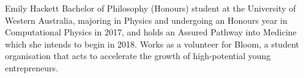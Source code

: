 \documentclass[journal]{IEEEtran}
\begin{document}
\begin{IEEEbiography}
	{Emily Hackett}
	Bachelor of Philosophy (Honours) student at the University of Western Australia, majoring in Physics and undergoing an Honours year in Computational Physics in 2017, and holds an Assured Pathway into Medicine which she intends to begin in 2018. Works as a volunteer for Bloom, a student organisation that acts to accelerate the growth of high-potential young entrepreneurs.
\end{IEEEbiography}
\end{document}
